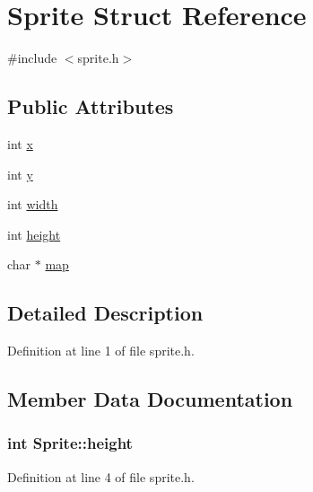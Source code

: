 \hypertarget{struct_sprite}{}\section{Sprite Struct Reference}
\label{struct_sprite}


{\ttfamily \#include $<$sprite.\+h$>$}

\subsection*{Public Attributes}
\begin{DoxyCompactItemize}
\item 
int \hyperlink{struct_sprite_ab36028dcefdd4bf024c52c8d9519a283}{x}
\item 
int \hyperlink{struct_sprite_a363e26017ee2aaed8636f7dab92af2cd}{y}
\item 
int \hyperlink{struct_sprite_a0a3364944c5e361fc9e7ae406224d682}{width}
\item 
int \hyperlink{struct_sprite_a1f07c8f2080c193759aec0e13503d7ab}{height}
\item 
char $\ast$ \hyperlink{struct_sprite_a1660748aff8d6d05bfe2cffe81034dee}{map}
\end{DoxyCompactItemize}


\subsection{Detailed Description}


Definition at line 1 of file sprite.\+h.



\subsection{Member Data Documentation}
\hypertarget{struct_sprite_a1f07c8f2080c193759aec0e13503d7ab}{}
\subsubsection[{height}]{\setlength{\rightskip}{0pt plus 5cm}int Sprite\+::height}\label{struct_sprite_a1f07c8f2080c193759aec0e13503d7ab}


Definition at line 4 of file sprite.\+h.

\hypertarget{struct_sprite_a1660748aff8d6d05bfe2cffe81034dee}{}
